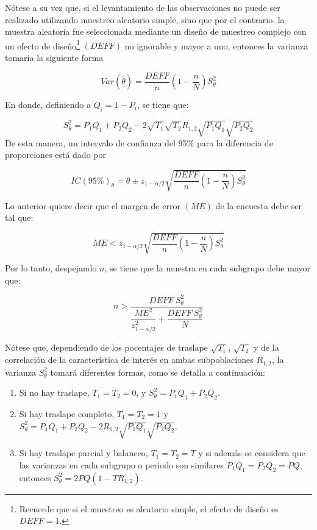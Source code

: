 \documentclass[
  12pt,
]{book}
\providecommand{\tightlist}{%
  \setlength{\itemsep}{0pt}\setlength{\parskip}{0pt}}
\begin{document}
Nótese a su vez que, si el levantamiento de las observaciones no puede ser realizado utilizando muestreo aleatorio simple, sino que por el contrario, la muestra aleatoria fue seleccionada mediante un diseño de muestreo complejo con un efecto de diseño\footnote{Recuerde que si el muestreo es aleatorio simple, el efecto de diseño es \(DEFF=1\).} \((DEFF)\) no ignorable y mayor a uno, entonces la varianza tomaría la siguiente forma

\[
Var(\hat{\theta})=\frac{DEFF}{n}\left(1-\frac{n}{N}\right)S^2_{\theta}
\]

En donde, definiendo a \(Q_i = 1-P_i\), se tiene que:

\[
S^2_{\theta} = P_1Q_1+P_2Q_2 - 2 \sqrt{T_1}\sqrt{T_2}R_{1,2} \sqrt{P_1Q_1}\sqrt{P_2Q_2}
\]
De esta manera, un intervalo de confianza del 95\% para la diferencia de proporciones está dado por

\[
IC(95\%)_{\theta}=\hat{\theta} \pm z_{1-\alpha/2} \sqrt{\frac{DEFF}{n}\left(1-\frac{n}{N}\right)S^2_{\theta}}
\]

Lo anterior quiere decir que el margen de error \((ME)\) de la encuesta debe ser tal que:

\[
ME < z_{1-\alpha/2} \sqrt{\frac{DEFF}{n}\left(1-\frac{n}{N}\right)S^2_{\theta}}
\]

Por lo tanto, despejando \(n\), se tiene que la muestra en cada subgrupo debe mayor que:

\[
 n> \dfrac{DEFF \ S^2_{\theta}}{\dfrac{ME^2}{z_{1-\alpha/2}^2}+\dfrac{DEFF \ S^2_{\theta}}{N}}
\]

Nótese que, dependiendo de los pocentajes de traslape \(\sqrt{T_1}\), \(\sqrt{T_2}\) y de la correlación de la característica de interés en ambas subpoblaciones \(R_{1,2}\), la varianza \(S^2_{\theta}\) tomará diferentes formas, como se detalla a continuación:

\begin{enumerate}
\def\labelenumi{\arabic{enumi}.}
\tightlist
\item
  Si no hay traslape, \(T_1 = T_2 = 0\), y \(S^2_{\theta} = P_1Q_1+P_2Q_2\).
\item
  Si hay traslape completo, \(T_1 = T_2 = 1\) y \(S^2_{\theta} = P_1Q_1+P_2Q_2 - 2 R_{1,2} \sqrt{P_1Q_1}\sqrt{P_2Q_2}\).
\item
  Si hay traslape parcial y balanceo, \(T_1 = T_2 = T\) y si además se considera que las varianzas en cada subgrupo o periodo son similares \(P_1Q_1 = P_2Q_2 = PQ\), entonces \(S^2_{\theta} = 2PQ (1- TR_{1,2})\).
\end{enumerate}
\end{document}
